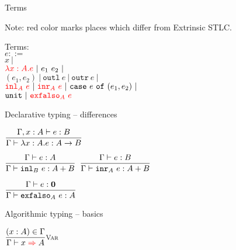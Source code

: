 \documentclass{beamer}
\newcommand{\pipe}{\ |\ }
\newcommand{\Fun}[2]{#1 \to #2}
\newcommand{\Sum}[2]{#1 + #2}
\newcommand{\Empty}{\textbf{0}}
\newcommand{\app}[2]{#1\ #2}
\newcommand{\pair}[2]{(#1, #2)}
\newcommand{\outl}[1]{\texttt{outl}\ #1}
\newcommand{\outr}[1]{\texttt{outr}\ #1}
\newcommand{\case}[3]{\texttt{case}\ #1\ \texttt{of}\ (#2, #3)}
\newcommand{\unit}{\texttt{unit}}
\newcommand{\fulltyping}[3]{#1 \vdash #2 : #3}
\newcommand{\typing}[2]{\fulltyping{\Gamma}{#1}{#2}}
\newcommand{\rulename}[1]{\textsc{\footnotesize{#1}}}
\newcommand{\infrule}[3][]{\displaystyle \frac{#2}{#3} \rulename{#1}}
\newcommand{\extend}[3]{#1, #2 : #3}
\newcommand{\sidecond}[1]{#1}
\begin{document}
\begin{frame}{Terms}

Note: red color marks places which differ from Extrinsic STLC.

\vspace{2em}

Terms: \\
$e ::=$ \\
\qquad $x \pipe$ \\
\qquad $\termdiff{\ifun{x}{A}{e}} \pipe \app{e_1}{e_2} \pipe$ \\
\qquad $\pair{e_1}{e_2} \pipe \outl{e} \pipe \outr{e} \pipe$ \\
\qquad $\termdiff{\iinl{A}{e}} \pipe \termdiff{\iinr{A}{e}} \pipe \case{e}{e_1}{e_2} \pipe$ \\
\qquad $\unit \pipe \termdiff{\iexfalso{A}{e}}$

\vspace{2em}

\end{frame}

\begin{frame}{Declarative typing -- differences}

\begin{center}
  $\infrule{\fulltyping{\extend{\Gamma}{x}{A}}{e}{B}}{\typing{\ifun{x}{A}{e}}{\Fun{A}{B}}}$

  \vspace{2em}

  $\infrule{\typing{e}{A}}{\typing{\iinl{B}{e}}{\Sum{A}{B}}}$ \quad
  $\infrule{\typing{e}{B}}{\typing{\iinr{A}{e}}{\Sum{A}{B}}}$

  \vspace{2em}

  $\infrule{\typing{e}{\Empty}}{\typing{\iexfalso{A}{e}}{A}}$
\end{center}

\end{frame}

\begin{frame}{Algorithmic typing -- basics}

\begin{center}
  $\infrule[Var]{\sidecond{(x : A) \in \Gamma}}{\infer{x}{A}}$
\end{center}

\end{frame}
\end{document}
